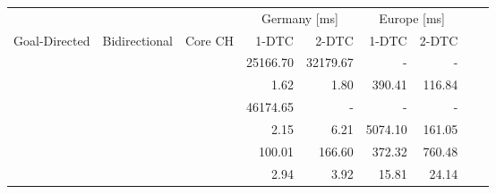 \begin{tabular}{cccrrrrrr}
	\toprule
	              &               &         & \multicolumn{2}{c}{Germany [\si{\milli\second}]} & \multicolumn{2}{c}{Europe [\si{\milli\second}]}                 \\
	Goal-Directed & Bidirectional & Core CH & 1-DTC                                            & 2-DTC                                           & 1-DTC & 2-DTC \\
	\midrule
	\xmark        & \xmark        & \xmark  & 25166.70                                                & 32179.67                                               & -     & -     \\
	\cmark        & \xmark        & \xmark  & 1.62                                                & 1.80                                               & 390.41     & 116.84     \\
	\xmark        & \cmark        & \xmark  & 46174.65                                                & -                                               & -     & -     \\
	\cmark        & \cmark        & \xmark  & 2.15                                                & 6.21                                               & 5074.10     & 161.05     \\
	\xmark        & \cmark        & \cmark  & 100.01                                                & 166.60                                               & 372.32     & 760.48     \\
	\cmark        & \cmark        & \cmark  & 2.94                                                & 3.92                                               & 15.81     & 24.14     \\
	\bottomrule
\end{tabular}